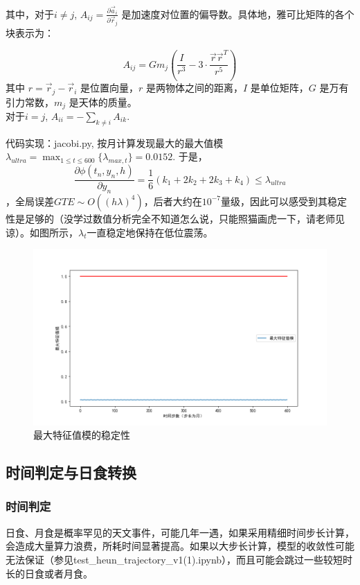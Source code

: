 \documentclass[hidelinks]{article}
\newcommand{\dps}{\displaystyle}
\begin{document}
其中，对于$i \neq j$, \( A_{ij} = \frac{\partial \vec{a}_i}{\partial \vec{r}_j} \) 是加速度对位置的偏导数。具体地，雅可比矩阵的各个块表示为：

\[
A_{ij} = G m_j \left( \frac{I}{r^3} - 3 \cdot \frac{\vec{r} \vec{r}^T}{r^5} \right)
\]
其中 \( r = \vec{r}_j - \vec{r}_i \) 是位置向量，\( r \) 是两物体之间的距离，\( I \) 是单位矩阵，\( G \) 是万有引力常数，\( m_j \) 是天体的质量。
\\
对于$i = j$, $\dps A_{ii} = - \sum_{k\neq i}A_{ik}$.

代码实现：jacobi.py, 按月计算发现最大的最大值模$\lambda_{ultra} = \max_{1\le t\le 600}\{\lambda_{max, t}\} = 0.0152$. 于是，
$$\frac{\partial \phi(t_n, y_n, h)}{\partial y_n} = \frac 1 6(k_1 + 2k_2 + 2k_3 + k_4) \le \lambda_{ultra}$$，全局误差$GTE \sim O((h\lambda)^4)$，后者大约在$10^{-7}$量级，因此可以感受到其稳定性是足够的（没学过数值分析完全不知道怎么说，只能照猫画虎一下，请老师见谅）。如图所示，$\lambda_t$一直稳定地保持在低位震荡。
\begin{figure}[h]
    \centering
    \includegraphics[width=0.8\linewidth]{images/Figure_1.png}
    \caption{最大特征值模的稳定性}
    \label{fig:enter-label}
\end{figure}

\subsection{时间判定与日食转换}

\subsubsection{时间判定}


日食、月食是概率罕见的天文事件，可能几年一遇，如果采用精细时间步长计算，会造成大量算力浪费，所耗时间显著提高。如果以大步长计算，模型的收敛性可能无法保证（参见test\_heun\_trajectory\_v1(1).ipynb），而且可能会跳过一些较短时长的日食或者月食。
\end{document}
